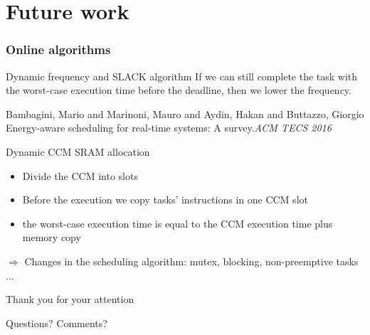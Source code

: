 \documentclass[
	11pt, %
]{beamer}
\begin{document}
\section{Future work}
\begin{frame}
	\frametitle{Online algorithms}
	\begin{block}{Dynamic frequency and SLACK algorithm}
		If we can still complete the task with the worst-case execution time before the deadline, then we lower the frequency. 
		\begin{thebibliography}{10}
			{\tiny
			\bibitem{} Bambagini, Mario and Marinoni, Mauro and Aydin, Hakan and Buttazzo, Giorgio
			\newblock Energy-aware scheduling for real-time systems: A survey.{\em{ACM TECS 2016}}
			}
		\end{thebibliography}
	\end{block}
	\begin{block}{Dynamic CCM SRAM allocation}
		\begin{itemize}
			\item Divide the CCM into slots
			\item Before the execution we copy tasks' instructions in one CCM slot
			\item the worst-case execution time is equal to the CCM execution time plus memory copy
			
		\end{itemize}
		$\Rightarrow$ Changes in the scheduling algorithm: mutex, blocking, non-preemptive tasks $\ldots$

	\end{block}
\end{frame}





\begin{frame} %
	\begin{center}
		{\Huge Thank you for your attention}
		
		\bigskip\bigskip %
		
		{\LARGE Questions? Comments?}
	\end{center}
\end{frame}

\end{document}
